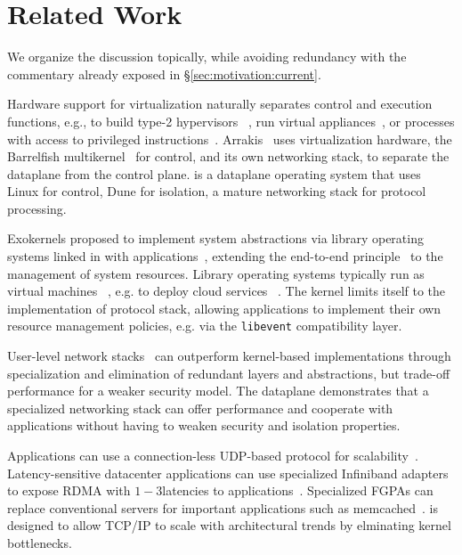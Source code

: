 

\section{Related Work}
\label{sec:related}

We organize the discussion topically, while avoiding redundancy with
the commentary already exposed in \S\ref{sec:motivation:current}.


 Hardware support for
virtualization naturally separates control and execution functions,
e.g., to build type-2 hypervisors
~\cite{DBLP:journals/tocs/BugnionDRSW12,misc/kivity07kvm}, run virtual
appliances~\cite{DBLP:conf/lisa/SapuntzakisBCZCLR03}, or processes
with access to privileged instructions~\cite{belay2012dune}.
Arrakis~\cite{peter2013arrakis,arrakisTR13} uses virtualization
hardware, the Barrelfish
multikernel~\cite{DBLP:conf/sosp/BaumannBDHIPRSS09} for control, and
its own networking stack, to separate the dataplane from the control
plane. \ix is a dataplane operating system that uses Linux for
control, Dune for isolation, a mature networking stack for protocol
processing.


Exokernels proposed to implement system abstractions via library
operating systems linked in with
applications~\cite{DBLP:conf/sosp/EnglerKO95}, extending the
end-to-end principle~\cite{DBLP:journals/tocs/SaltzerRC84} to the
management of system resources.  Library operating systems typically
run as virtual machines ~\cite{DBLP:journals/tocs/BugnionDGR97},
e.g. to deploy cloud services
~\cite{DBLP:conf/asplos/MadhavapeddyMRSSGSHC13}. The \ix kernel limits
itself to the implementation of protocol stack, allowing applications
to implement their own resource management policies, e.g. via the
\texttt{libevent} compatibility layer.


 User-level network
stacks~\cite{jeong2014mtcp, marinos2013network, openonload} can
outperform kernel-based implementations through specialization and
elimination of redundant layers and abstractions, but trade-off
performance for a weaker security model.  The \ix dataplane
demonstrates that a specialized networking stack can offer performance
and cooperate with applications without having to weaken security and
isolation properties.
 

Applications can use a connection-less UDP-based protocol for
scalability~\cite{nishtala2013scaling}.  Latency-sensitive datacenter
applications can use specialized Infiniband adapters to expose RDMA
with $1-3$\microsecond latencies to
applications~\cite{DBLP:conf/sosp/OngaroRSOR11,Jose:2011:MDH,mitchell:rdma,dragojevic14farm}.
Specialized FGPAs can replace conventional servers for important
applications such as
memcached~\cite{DBLP:conf/fpga/ChalamalasettiLWARM13}.  \ix is
designed to allow TCP/IP to scale with architectural trends by
elminating kernel bottlenecks.


